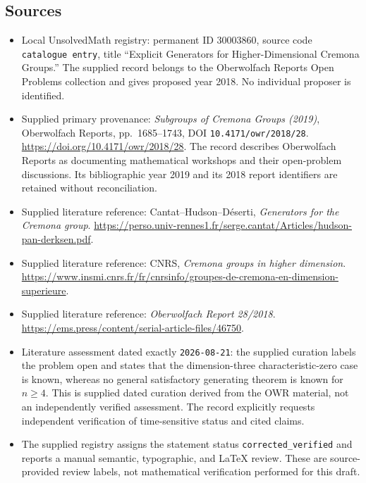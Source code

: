 \documentclass[11pt]{article}
\begin{document}
\subsection{Sources}
\begin{itemize}
\item Local UnsolvedMath registry: permanent ID \(30003860\), source code \texttt{catalogue entry}, title ``Explicit Generators for Higher-Dimensional Cremona Groups.'' The supplied record belongs to the Oberwolfach Reports Open Problems collection and gives proposed year 2018. No individual proposer is identified.
\item Supplied primary provenance: \emph{Subgroups of Cremona Groups (2019)}, Oberwolfach Reports, pp.\ 1685--1743, DOI \texttt{10.4171/owr/2018/28}. \url{https://doi.org/10.4171/owr/2018/28}. The record describes Oberwolfach Reports as documenting mathematical workshops and their open-problem discussions. Its bibliographic year 2019 and its 2018 report identifiers are retained without reconciliation.
\item Supplied literature reference: Cantat--Hudson--D\'eserti, \emph{Generators for the Cremona group}. \url{https://perso.univ-rennes1.fr/serge.cantat/Articles/hudson-pan-derksen.pdf}.
\item Supplied literature reference: CNRS, \emph{Cremona groups in higher dimension}. \url{https://www.insmi.cnrs.fr/fr/cnrsinfo/groupes-de-cremona-en-dimension-superieure}.
\item Supplied literature reference: \emph{Oberwolfach Report 28/2018}. \url{https://ems.press/content/serial-article-files/46750}.
\item Literature assessment dated exactly \texttt{2026-08-21}: the supplied curation labels the problem open and states that the dimension-three characteristic-zero case is known, whereas no general satisfactory generating theorem is known for \(n\geq4\). This is supplied dated curation derived from the OWR material, not an independently verified assessment. The record explicitly requests independent verification of time-sensitive status and cited claims.
\item The supplied registry assigns the statement status \texttt{corrected\_verified} and reports a manual semantic, typographic, and LaTeX review. These are source-provided review labels, not mathematical verification performed for this draft.
\end{itemize}
\end{document}
